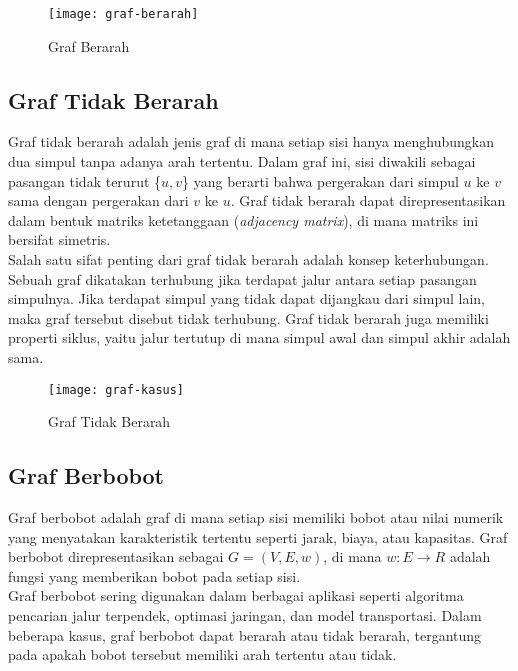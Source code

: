 \begin{figure}[H] 
    \centering  
    \texttt{[image: graf-berarah]}  
    \caption{Graf Berarah}
    \label{fig:grafberarah} 
\end{figure}

\subsection{Graf Tidak Berarah ~\cite{Diestel:17:graph}}
\label{sec:graftidakberarah}
Graf tidak berarah adalah jenis graf di mana setiap sisi hanya menghubungkan dua simpul tanpa adanya arah tertentu. Dalam graf ini, sisi diwakili sebagai pasangan tidak terurut \{$u,v$\} yang berarti bahwa pergerakan dari simpul $u$ ke $v$ sama dengan pergerakan dari $v$ ke $u$. Graf tidak berarah dapat direpresentasikan dalam bentuk matriks ketetanggaan (\textit{adjacency matrix}), di mana matriks ini bersifat simetris.
\\
Salah satu sifat penting dari graf tidak berarah adalah konsep keterhubungan. Sebuah graf dikatakan terhubung jika terdapat jalur antara setiap pasangan simpulnya. Jika terdapat simpul yang tidak dapat dijangkau dari simpul lain, maka graf tersebut disebut tidak terhubung. Graf tidak berarah juga memiliki properti siklus, yaitu jalur tertutup di mana simpul awal dan simpul akhir adalah sama.

\begin{figure}[H] 
    \centering  
    \texttt{[image: graf-kasus]}  
    \caption{Graf Tidak Berarah}
    \label{fig:graftidakberarah} 
\end{figure}

\subsection{Graf Berbobot ~\cite{Diestel:17:graph}}
\label{sec:grafberbobot}
Graf berbobot adalah graf di mana setiap sisi memiliki bobot atau nilai numerik yang menyatakan karakteristik tertentu seperti jarak, biaya, atau kapasitas. Graf berbobot direpresentasikan sebagai $G = (V,E,w)$, di mana $w:E\rightarrow R$ adalah fungsi yang memberikan bobot pada setiap sisi.
\\
Graf berbobot sering digunakan dalam berbagai aplikasi seperti algoritma pencarian jalur terpendek, optimasi jaringan, dan model transportasi. Dalam beberapa kasus, graf berbobot dapat berarah atau tidak berarah, tergantung pada apakah bobot tersebut memiliki arah tertentu atau tidak.

